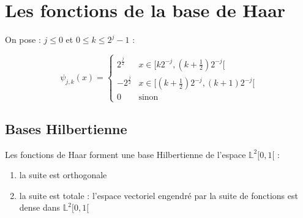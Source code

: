 \documentclass{article}
\begin{document}

\section{Les fonctions de la base de Haar}

On pose : $j \leqslant 0$ et $0 \leqslant k \leqslant 2^j-1$ : 

\[ 
{\psi_{j,k}(x)}= \left\{
\begin{array}{ll}
      2^{\frac{j}{2}} & x \in [k2^{-j}, (k+\frac{1}{2})2^{-j} [\\
      -2^{\frac{j}{2}} & x \in [(k+\frac{1}{2})2^{-j}, (k+1)2^{-j}[ \\
      0 & \text{sinon}
\end{array} 
\right. 
\]

\subsection{Bases Hilbertienne}

Les fonctions de Haar forment une base Hilbertienne de l'espace $\mathbb{L}^2[0,1[$ :

\begin{enumerate}
    \item la suite est orthogonale
    \item la suite est totale : l'espace vectoriel engendré par la suite de fonctions est dense dans $\mathbb{L}^2[0,1[$
\end{enumerate}
\end{document}

